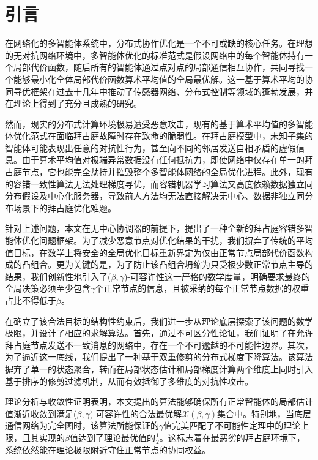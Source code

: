 \documentclass[12pt,hyperref,a4paper,UTF8]{ctexart}
\numberwithin{equation}{section}
\numberwithin{figure}{section}
\numberwithin{table}{section}
\begin{document}
\section{引言}

\quad \quad  在网络化的多智能体系统中，分布式协作优化是一个不可或缺的核心任务。在理想的无对抗网络环境中，多智能体优化的标准范式是假设网络中的每个智能体持有一个局部代价函数，随后所有的智能体通过点对点的局部通信相互协作，共同寻找一个能够最小化全体局部代价函数算术平均值的全局最优解\cite{nedic2009distributed}。这一基于算术平均的协同寻优框架在过去十几年中推动了传感器网络、分布式控制等领域的蓬勃发展，并在理论上得到了充分且成熟的研究。

然而，现实的分布式计算环境极易遭受恶意攻击，现有的基于算术平均值的多智能体优化范式在面临拜占庭故障时存在致命的脆弱性。在拜占庭模型中\cite{lynch1996distributed}，未知子集的智能体可能表现出任意的对抗性行为，甚至向不同的邻居发送自相矛盾的虚假信息。由于算术平均值对极端异常数据没有任何抵抗力，即使网络中仅存在单一的拜占庭节点，它也能完全劫持并摧毁整个多智能体网络的全局优化进程\cite{sundaram2019distributed}。此外，现有的容错一致性算法无法处理梯度寻优\cite{vaidya2012iterative}，而容错机器学习算法又高度依赖数据独立同分布假设及中心化服务器\cite{yin2018byzantine}，导致前人方法均无法直接解决无中心、数据非独立同分布场景下的拜占庭优化难题。

针对上述问题，本文在无中心协调器的前提下，提出了一种全新的拜占庭容错多智能体优化问题框架。为了减少恶意节点对优化结果的干扰，我们摒弃了传统的平均值目标，在数学上将安全的全局优化目标重新界定为仅由正常节点局部代价函数构成的凸组合。更为关键的是，为了防止该凸组合坍缩为只受极少数正常节点主导的结果，我们创新性地引入了($\beta, \gamma$)-可容许性这一严格的数学度量，明确要求最终的全局决策必须至少包含$\gamma$个正常节点的信息，且被采纳的每个正常节点数据的权重占比不得低于$\beta$。

在确立了该合法目标的结构性约束后，我们进一步从理论底层探索了该问题的数学极限，并设计了相应的求解算法。首先，通过不可区分性论证，我们证明了在允许拜占庭节点发送不一致消息的网络中，存在一个不可逾越的不可能性边界。其次，为了逼近这一底线，我们提出了一种基于双重修剪的分布式梯度下降算法。该算法摒弃了单一的状态聚合，转而在局部状态估计和局部梯度计算两个维度上同时引入基于排序的修剪过滤机制，从而有效抵御了多维度的对抗性攻击。

理论分析与收敛性证明表明，本文提出的算法能够确保所有正常智能体的局部估计值渐近收敛到满足($\beta, \gamma$)-可容许性的合法最优解$\mathcal{X}(\beta, \gamma)$集合中。特别地，当底层通信网络为完全图时，该算法所能保证的$\gamma$值完美匹配了不可能性定理中的理论上限，且其实现的$\beta$值达到了理论最优值的$\frac{1}{2}$。这标志着在最恶劣的拜占庭环境下，系统依然能在理论极限附近守住正常节点的协同权益。
\end{document}
